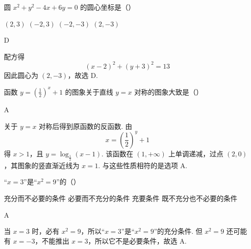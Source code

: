 \begin{problem}
圆 \(x^2 + y^2 - 4x + 6y = 0\) 的圆心坐标是（\quad）

\choices
    {\((2, 3)\)}
    {\((-2, 3)\)}
    {\((-2, -3)\)}
    {\((2, -3)\)}
\end{problem}

\begin{answer}
D
\end{answer}

\begin{solution}
配方得
\[
(x-2)^2+(y+3)^2=13
\]
因此圆心为 \((2,-3)\)，故选 D.
\end{solution}

\begin{problem}
函数 \(y = \left(\frac{1}{2}\right)^x + 1\) 的图象关于直线 \(y = x\) 对称的图象大致是（\quad）

    {}
    {}
    {}
\end{problem}

\begin{answer}
A
\end{answer}

\begin{solution}
关于 \(y=x\) 对称后得到原函数的反函数. 由
\[
x=\left(\frac{1}{2}\right)^y+1
\]
得 \(x>1\)，且 \(y=\log_{\frac12}(x-1)\). 该函数在 \((1,+\infty)\) 上单调递减，过点 \((2,0)\)，其图象的竖直渐近线为 \(x=1\). 与这些性质相符的是选项 A.
\end{solution}

\begin{problem}
“\(x = 3\)”是“\(x^2 = 9\)”的（\quad）

\choices
    {充分而不必要的条件}
    {必要而不充分的条件}
    {充要条件}
    {既不充分也不必要的条件}
\end{problem}

\begin{answer}
A
\end{answer}

\begin{solution}
当 \(x=3\) 时，必有 \(x^2=9\)，所以“\(x=3\)”是“\(x^2=9\)”的充分条件. 但 \(x^2=9\) 还可能有 \(x=-3\)，不能推出 \(x=3\)，所以它不是必要条件，故选 A.
\end{solution}

